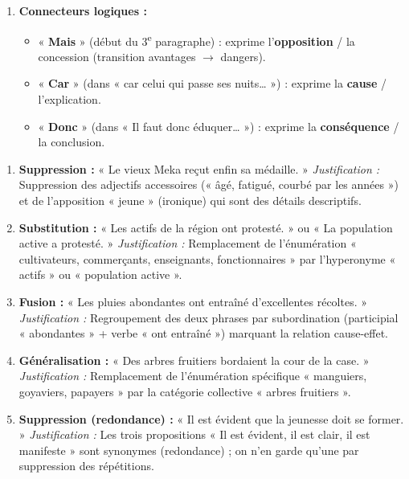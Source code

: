 \documentclass[11pt]{article}
\newcommand{\cle}[1]{{\popxbold\color{popdark}#1}}
\begin{document}
\begin{corrige}
\begin{enumerate}
\item \textbf{Connecteurs logiques :}
\begin{itemize}
\item « \textbf{Mais} » (début du 3\textsuperscript{e} paragraphe) : exprime l'\textbf{opposition} / la concession (transition avantages $\rightarrow$ dangers).
\item « \textbf{Car} » (dans « car celui qui passe ses nuits… ») : exprime la \textbf{cause} / l'explication.
\item « \textbf{Donc} » (dans « Il faut donc éduquer… ») : exprime la \textbf{conséquence} / la conclusion.
\end{itemize}
\end{enumerate}
\end{corrige}

\begin{corrige}
\begin{enumerate}
\item \textbf{Suppression :} « Le vieux Meka reçut enfin sa médaille. » \textit{Justification :} Suppression des adjectifs accessoires (« âgé, fatigué, courbé par les années ») et de l'apposition « jeune » (ironique) qui sont des détails descriptifs.
\item \textbf{Substitution :} « Les actifs de la région ont protesté. » ou « La population active a protesté. » \textit{Justification :} Remplacement de l'énumération « cultivateurs, commerçants, enseignants, fonctionnaires » par l'hyperonyme « actifs » ou « population active ».
\item \textbf{Fusion :} « Les pluies abondantes ont entraîné d'excellentes récoltes. » \textit{Justification :} Regroupement des deux phrases par subordination (participial « abondantes » + verbe « ont entraîné ») marquant la relation cause-effet.
\item \textbf{Généralisation :} « Des arbres fruitiers bordaient la cour de la case. » \textit{Justification :} Remplacement de l'énumération spécifique « manguiers, goyaviers, papayers » par la catégorie collective « arbres fruitiers ».
\item \textbf{Suppression (redondance) :} « Il est évident que la jeunesse doit se former. » \textit{Justification :} Les trois propositions « Il est évident, il est clair, il est manifeste » sont synonymes (redondance) ; on n'en garde qu'une par \cle{suppression} des répétitions.
\end{enumerate}
\end{corrige}
\end{document}
